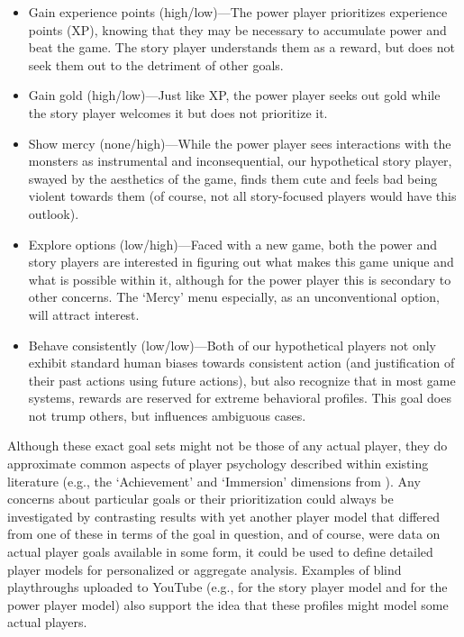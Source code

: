 \documentclass[arts,article,submit,moreauthors,pdftex,10pt,a4paper]{Definitions/mdpi}
\begin{document}
\begin{itemize}
  \item Gain experience points (high/low)---The power player prioritizes experience points (XP), knowing that they may be necessary to accumulate power and beat the game. The story player understands them as a reward, but does not seek them out to the detriment of other goals.
  \item Gain gold (high/low)---Just like XP, the power player seeks out gold while the story player welcomes it but does not prioritize it.
  \item Show mercy (none/high)---While the power player sees interactions with the monsters as instrumental and inconsequential, our hypothetical story player, swayed by the aesthetics of the game, finds them cute and feels bad being violent towards them (of course, not all story-focused players would have this outlook).
  \item Explore options (low/high)---Faced with a new game, both the power and story players are interested in figuring out what makes this game unique and what is possible within it, although for the power player this is secondary to other concerns. The `Mercy' menu especially, as an unconventional option, will attract interest.
  \item Behave consistently (low/low)---Both of our hypothetical players not only exhibit standard human biases towards consistent action (and justification of their past actions using future actions), but also recognize that in most game systems, rewards are reserved for extreme behavioral profiles. This goal does not trump others, but influences ambiguous cases.
\end{itemize}
Although these exact goal sets might not be those of any actual player, they do approximate common aspects of player psychology described within existing literature (e.g., the `Achievement' and `Immersion' dimensions from \cite{hamari2014player}).
%
Any concerns about particular goals or their prioritization could always be investigated by contrasting results with yet another player model that differed from one of these in terms of the goal in question, and of course, were data on actual player goals available in some form, it could be used to define detailed player models for personalized or aggregate analysis.
%
Examples of blind playthroughs uploaded to YouTube (e.g., \cite{fuandon2015lets} for the story player model and \cite{therpgminx2015lets} for the power player model) also support the idea that these profiles might model some actual players.
\end{document}
